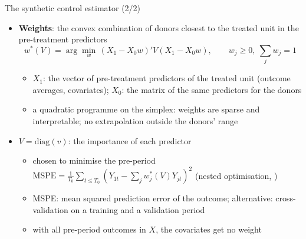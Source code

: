 \begin{frame}{The synthetic control estimator (2/2)}
\itemsize{\small}
\begin{itemize}
    \item \textbf{Weights}: the convex combination of donors closest to the treated unit in the pre-treatment predictors \[ w^*(V) = \arg\min_w\, (X_1 - X_0w)'V(X_1 - X_0w), \qquad w_j \ge 0,\ \sum_j w_j = 1 \]
    \begin{itemize}
        \item $X_1$: the vector of pre-treatment predictors of the treated unit (outcome averages, covariates); $X_0$: the matrix of the same predictors for the donors
        \item a quadratic programme on the simplex: weights are sparse and interpretable; no extrapolation outside the donors' range
    \end{itemize}
    \item $V = \mathrm{diag}(v)$: the importance of each predictor
    \begin{itemize}
        \item chosen to minimise the pre-period $\mathrm{MSPE} = \frac{1}{T_0}\sum_{t \le T_0}(Y_{1t} - \sum_j w_j^*(V)Y_{jt})^2$ (nested optimisation, )
        \item MSPE: mean squared prediction error of the outcome; alternative: cross-validation on a training and a validation period 
        \item with all pre-period outcomes in $X$, the covariates get no weight 
    \end{itemize}
\end{itemize}
\end{frame}

